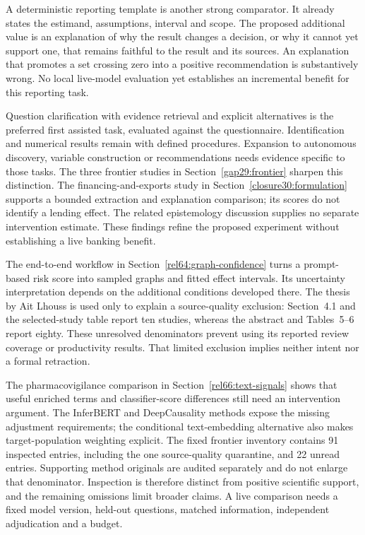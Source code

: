 A deterministic reporting template is another strong comparator. It already
states the estimand, assumptions, interval and scope. The proposed additional
value is an explanation of why the result changes a decision, or why it
cannot yet support one, that remains faithful to the result and its sources.
An explanation that promotes a set crossing zero into a positive recommendation
is substantively wrong. No local live-model evaluation yet establishes an
incremental benefit for this reporting task.

Question clarification with evidence retrieval and explicit alternatives is
the preferred first assisted task, evaluated against the questionnaire.
Identification and numerical results remain with defined procedures. Expansion
to autonomous discovery, variable construction or recommendations needs
evidence specific to those tasks. The three frontier studies in
Section~\ref{gap29:frontier} sharpen this distinction. The financing-and-exports
study in Section~\ref{closure30:formulation} supports a bounded extraction and
explanation comparison; its scores do not identify a lending effect. The
related epistemology discussion supplies no separate intervention estimate.
These findings refine the proposed experiment without establishing a live
banking benefit. \citep{rel18li,rel18mugleston}

The end-to-end workflow in Section~\ref{rel64:graph-confidence} turns a
prompt-based risk score into sampled graphs and fitted effect intervals. Its
uncertainty interpretation depends on the additional conditions developed
there. The thesis by Ait Lhouss is used only to explain a source-quality
exclusion: Section~4.1 and the selected-study table report ten studies, whereas
the abstract and Tables~5--6 report eighty. These unresolved denominators
prevent using its reported review coverage or productivity results. That
limited exclusion implies neither intent nor a formal retraction.
\citep{rel64molero,rel64aitlhouss}

The pharmacovigilance comparison in Section~\ref{rel66:text-signals} shows
that useful enriched terms and classifier-score differences still need an
intervention argument. The InferBERT and DeepCausality methods expose the
missing adjustment requirements; the conditional text-embedding alternative
also makes target-population weighting explicit. The fixed frontier inventory
contains 91 inspected entries, including the one source-quality quarantine,
and 22 unread entries. Supporting method originals are audited separately
and do not enlarge that denominator. Inspection is therefore distinct from
positive scientific support, and the remaining omissions limit broader claims.
A live comparison needs a fixed model version, held-out questions, matched
information, independent adjudication and a budget. \citep{rel66pharma,rel66inferbert,rel66deepcausality,rel66veitch}




